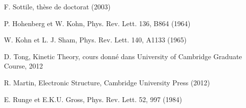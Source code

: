 \documentclass[12pt, french]{report}
\theoremstyle{theoreme}
\begin{document}
\begin{thebibliography}{9}

    F. Sottile, thèse de doctorat (2003)

    P. Hohenberg et W. Kohn, Phys. Rev. Lett. 136, B864 (1964)

    W. Kohn et L. J. Sham, Phys. Rev. Lett. 140, A1133 (1965)

    D. Tong, Kinetic Theory, cours donné dans University of Cambridge Graduate Course, 2012
    
	R. Martin, Electronic Structure, Cambridge University Press (2012)
	
	E. Runge et E.K.U. Gross, Phys. Rev. Lett. 52, 997 (1984)

\end{thebibliography}
\end{document}
